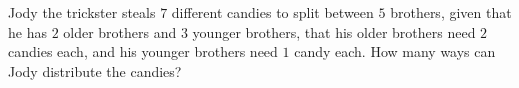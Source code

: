 Jody the trickster steals $7$ different candies to split between $5$ brothers, given that he has $2$ older brothers and $3$ younger brothers, that his older brothers need $2$ candies each, and his younger brothers need $1$ candy each. How many ways can Jody distribute the candies?
